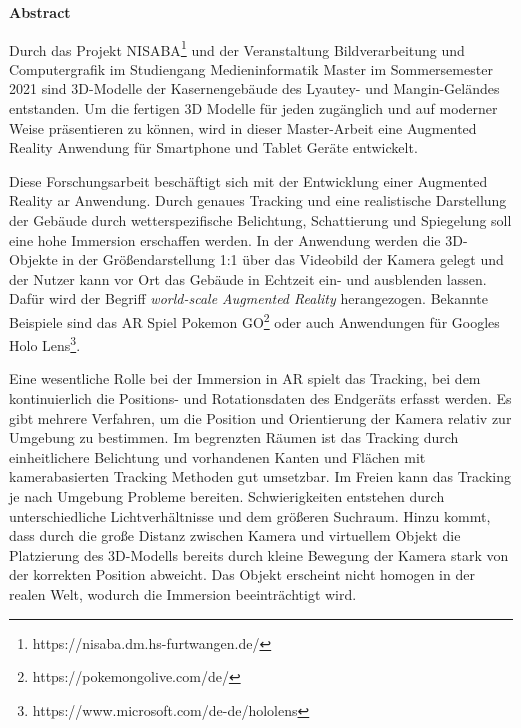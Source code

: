\thispagestyle{plain}
\begin{center}
    \Large
    \textbf{Abstract}
\end{center}

\noindent
Durch das Projekt NISABA\footnote{https://nisaba.dm.hs-furtwangen.de/} und der Veranstaltung Bildverarbeitung und Computergrafik im Studiengang Medieninformatik Master im Sommersemester 2021 sind 3D-Modelle der Kasernengebäude des Lyautey- und Mangin-Geländes entstanden. Um die fertigen 3D Modelle für jeden zugänglich und auf moderner Weise präsentieren zu können, wird in dieser Master-Arbeit eine Augmented Reality Anwendung für Smartphone und Tablet Geräte entwickelt.

Diese Forschungsarbeit beschäftigt sich mit der Entwicklung einer Augmented Reality \acrshort{ar} Anwendung. Durch genaues Tracking und eine realistische Darstellung der Gebäude durch wetterspezifische Belichtung, Schattierung und Spiegelung soll eine hohe Immersion erschaffen werden. In der Anwendung werden die 3D-Objekte in der Größendarstellung 1:1 über das Videobild der Kamera gelegt und der Nutzer kann vor Ort das Gebäude in Echtzeit ein- und ausblenden lassen. Dafür wird der Begriff \textit{world-scale Augmented Reality} herangezogen. Bekannte Beispiele sind das AR Spiel Pokemon GO\footnote{https://pokemongolive.com/de/} oder auch Anwendungen für Googles Holo Lens\footnote{https://www.microsoft.com/de-de/hololens}.

Eine wesentliche Rolle bei der Immersion in AR spielt das Tracking, bei dem kontinuierlich die Positions- und Rotationsdaten des Endgeräts erfasst werden.%
Es gibt mehrere Verfahren, um die Position und Orientierung der Kamera relativ zur Umgebung zu bestimmen. Im begrenzten Räumen ist das Tracking durch einheitlichere Belichtung und vorhandenen Kanten und Flächen mit kamerabasierten Tracking Methoden gut umsetzbar. Im Freien kann das Tracking je nach Umgebung Probleme bereiten. Schwierigkeiten entstehen durch unterschiedliche Lichtverhältnisse und dem größeren Suchraum. Hinzu kommt, dass durch die große Distanz zwischen Kamera und virtuellem Objekt die Platzierung des 3D-Modells bereits durch kleine Bewegung der Kamera stark von der korrekten Position abweicht. Das Objekt erscheint nicht homogen in der realen Welt, wodurch die Immersion beeinträchtigt wird.

